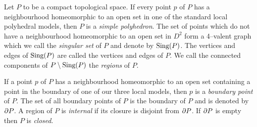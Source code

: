 \begin{defn}
	Let $P$ to be a compact topological space.	
	If every point $p$ of $P$ has a neighbourhood homeomorphic to an open set in one of the standard local polyhedral models, then $P$ is a \emph{simple polyhedron}.
	The set of points which do not have a neighbourhood homeomorphic to an open set in $D^2$ form a 4--valent graph which we call the \emph{singular set} of $P$ and denote by $\textrm{Sing} (P)$.
	The vertices and edges of $\textrm{Sing} (P)$ are called the vertices and edges of $P$.
	We call the connected components of $P\setminus\textrm{Sing} (P)$ the \emph{regions} of $P$.
	
	
	If a point $p$ of $P$ has a neighbourhood homeomorphic to an open set containing a point in the boundary of one of our three local models, then $p$ is a \emph{boundary point} of $P$.
	The set of all boundary points of $P$ is the boundary of $P$ and is denoted by $\partial P$.
	A region of $P$ is \emph{internal} if its closure is disjoint from $\partial P$.
	If $\partial P$ is empty then $P$ is \emph{closed}.
\end{defn}

